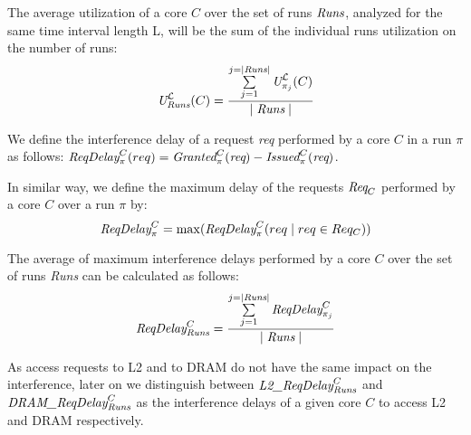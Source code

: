 The average utilization of a core $C$ over the set of runs $\emph{Runs}$, analyzed for the same time interval length {\cal L},  will be the sum of the individual runs utilization on the number of runs:
\[ \emph{U}_{\emph{Runs}}^{{\cal L}}(C)=\frac{\sum\limits_{j=1}^{j= \mid\emph{Runs}\mid} \emph{U}_{\pi_j}^{{\cal L}}(C)}{\mid\emph{Runs}\mid}
\]

\begin{definition}
We define the interference delay of a request \emph{req} performed by a core $C$ in a run $\pi$ as follows: $\emph{ReqDelay}_{\pi}^C(req)=\emph{Granted}_{\pi}^C(\emph{req})-\emph{Issued}_{\pi}^C(\emph{req})$. 

In similar way, we define the maximum delay of the requests $\emph{Req}_C$ performed by a core $C$ over a run $\pi$ by: 
\[\emph{ReqDelay}_{\pi}^C= \max(\emph{ReqDelay}_{\pi}^C(req\mid req\in Req_C))\]
\end{definition}

The average of maximum interference delays performed by a core $C$ over the set of runs \emph{Runs} can be calculated as follows: 
\[ \emph{ReqDelay}_{\emph{Runs}}^C=\frac{\sum\limits_{j=1}^{j= \mid\emph{Runs}\mid} \emph{ReqDelay}_{\pi_j}^C}
{\mid\emph{Runs}\mid}\]

As access requests to L2 and to DRAM do not have the same impact on the interference, later on we distinguish between $\emph{L2\_ReqDelay}_{\emph{Runs}}^C$ and $\emph{DRAM\_ReqDelay}_{\emph{Runs}}^C$ as the interference delays of a given core $C$ to access L2 and DRAM respectively. 